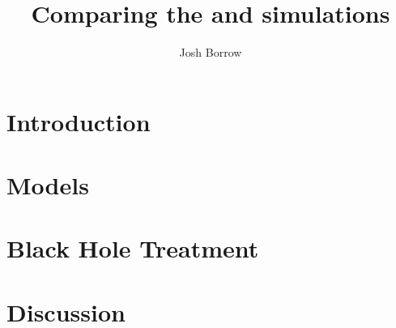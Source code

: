 \documentclass[a4paper, twocols]{article}
\author{Josh Borrow}
\title{Comparing the \hagn and \fii simulations}
\begin{document}
\maketitle

\section{Introduction}


\section{Models}


\section{Black Hole Treatment}


\section{Discussion}

\end{document}
